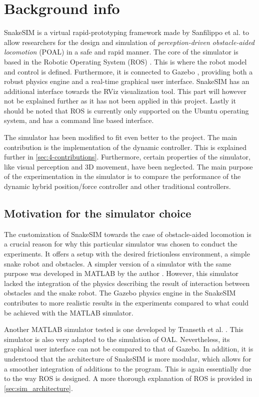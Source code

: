 \section{Background info}


SnakeSIM is a virtual rapid-prototyping framework made by Sanfilippo et al. \cite{sanfilippo2018snakesim} to allow researchers for the design and simulation of \textit{perception-driven obstacle-aided locomotion} (POAL) in a safe and rapid manner. The core of the simulator is based in the Robotic Operating System (ROS) \cite{quigley2009ros}. This is where the robot model and control is defined. Furthermore, it is connected to Gazebo \cite{koenig2004design}, providing both a robust physics engine and a real-time graphical user interface. SnakeSIM has an additional interface towards the RViz visualization tool. This part will however not be explained further as it has not been applied in this project. Lastly it should be noted that ROS is currently only supported on the Ubuntu operating system, and has a command line based interface.

The simulator has been modified to fit even better to the project. The main contribution is the implementation of the dynamic controller. This is explained further in \ref{sec:4-contributions}. Furthermore, certain properties of the simulator, like visual perception and 3D movement, have been neglected.
The main purpose of the experimentation in the simulator is to compare the performance of the dynamic hybrid position/force controller and other traditional controllers. 

\subsection{Motivation for the simulator choice}

The customization of SnakeSIM towards the case of obstacle-aided locomotion is a crucial reason for why this particular simulator was chosen to conduct the experiments. It offers a setup with the desired frictionless environment, a simple snake robot and obstacles. A simpler version of a simulator with the same purpose was developed in MATLAB by the author \cite{AtussaProsjektoppgp}. However, this simulator lacked the integration of the physics describing the result of interaction between obstacles and the snake robot. The Gazebo physics engine in the SnakeSIM contributes to more realistic results in the experiments compared to what could be achieved with the MATLAB simulator.

Another MATLAB simulator tested is one developed by Transeth et al. \cite{transeth2008snake}. This simulator is also very adapted to the simulation of OAL. Nevertheless, its graphical user interface can not be compared to that of Gazebo. In addition, it is understood that the architecture of SnakeSIM is more modular, which allows for a smoother integration of additions to the program. This is again essentially due to the way ROS is designed. A more thorough explanation of ROS is provided in \ref{sec:sim_architecture}.